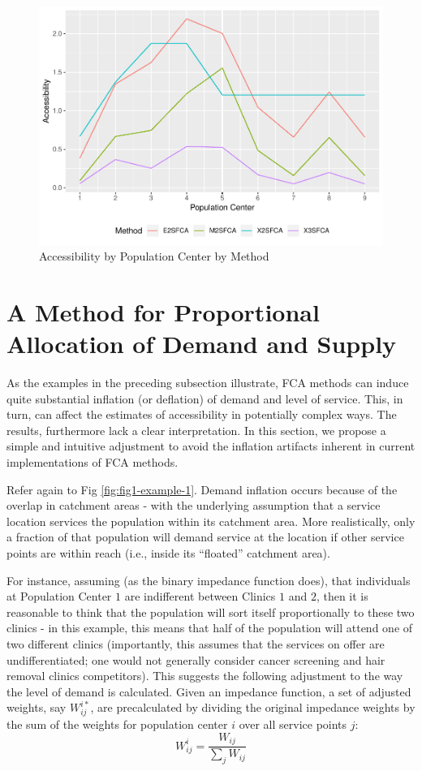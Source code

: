 \documentclass[10pt,letterpaper]{article}
\begin{document}
\begin{figure}
\includegraphics[width=0.95\linewidth]{Supply_and_Demand_Inflation_in_FCA_Methods_v2.0_files/figure-latex/fig-comparison-1} \caption{\label{fig:fig-comparison}Accessibility by Population Center by Method}\label{fig:fig-comparison}
\end{figure}

\section{A Method for Proportional Allocation of Demand and
Supply}\label{a-method-for-proportional-allocation-of-demand-and-supply}

As the examples in the preceding subsection illustrate, FCA methods can
induce quite substantial inflation (or deflation) of demand and level of
service. This, in turn, can affect the estimates of accessibility in
potentially complex ways. The results, furthermore lack a clear
interpretation. In this section, we propose a simple and intuitive
adjustment to avoid the inflation artifacts inherent in current
implementations of FCA methods.

Refer again to Fig \ref{fig:fig1-example-1}. Demand inflation occurs
because of the overlap in catchment areas - with the underlying
assumption that a service location services the population within its
catchment area. More realistically, only a fraction of that population
will demand service at the location if other service points are within
reach (i.e., inside its ``floated'' catchment area).

For instance, assuming (as the binary impedance function does), that
individuals at Population Center \(1\) are indifferent between Clinics
\(1\) and \(2\), then it is reasonable to think that the population will
sort itself proportionally to these two clinics - in this example, this
means that half of the population will attend one of two different
clinics (importantly, this assumes that the services on offer are
undifferentiated; one would not generally consider cancer screening and
hair removal clinics competitors). This suggests the following
adjustment to the way the level of demand is calculated. Given an
impedance function, a set of adjusted weights, say \(W^{i*}_{ij}\), are
precalculated by dividing the original impedance weights by the sum of
the weights for population center \(i\) over all service points \(j\):
\[
W_{ij}^{i} = \frac{W_{ij}}{\sum_j W_{ij}}
\]
\end{document}
